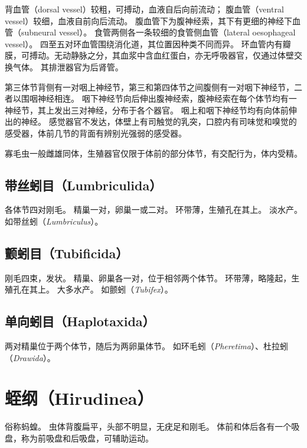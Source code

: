\documentclass[11pt]{article}
\begin{document}
\newline

背血管（dorsal vessel）较粗，可搏动，血液自后向前流动；
腹血管（ventral vessel）较细，血液自前向后流动。
腹血管下为腹神经索，其下有更细的神经下血管（subneural vessel）。
食管两侧各一条较细的食管侧血管（lateral oesophageal vessel）。
四至五对环血管围绕消化道，其位置因种类不同而异。
环血管内有瓣膜，可搏动。无动静脉之分，其血浆中含血红蛋白，亦无呼吸器官，仅通过体壁交换气体。
其排泄器官为后肾管。

\newline

第三体节背侧有一对咽上神经节，第三和第四体节之间腹侧有一对咽下神经节，二者以围咽神经相连。
咽下神经节向后伸出腹神经索，腹神经索在每个体节均有一神经节，其上发出三对神经，分布于各个器官。
咽上和咽下神经节均有向体前伸出的神经。
感觉器官不发达，体壁上有司触觉的乳突，口腔内有司味觉和嗅觉的感受器，体前几节的背面有辨别光强弱的感受器。

\newline

寡毛虫一般雌雄同体，生殖器官仅限于体前的部分体节，有交配行为，体内受精。

\subsection{带丝蚓目（Lumbriculida）}
各体节四对刚毛。
精巢一对，卵巢一或二对。
环带薄，生殖孔在其上。
淡水产。
如带丝蚓（\textit{Lumbriculus}）。

\subsection{颤蚓目（Tubificida）}
刚毛四束，发状。
精巢、卵巢各一对，位于相邻两个体节。
环带薄，略隆起，生殖孔在其上。
大多水产。
如颤蚓（\textit{Tubifex}）。

\subsection{单向蚓目（Haplotaxida）}
两对精巢位于两个体节，随后为两卵巢体节。
如环毛蚓（\textit{Pheretima}）、杜拉蚓（\textit{Drawida}）。

\section{蛭纲（Hirudinea）}
俗称蚂蝗。
虫体背腹扁平，头部不明显，无疣足和刚毛。
体前和体后各有一个吸盘，称为前吸盘和后吸盘，可辅助运动。

\newline
\end{document}
